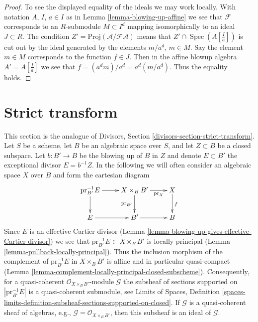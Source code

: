 \documentclass{stacks-project}
\theoremstyle{plain}
\theoremstyle{definition}
\theoremstyle{remark}
\numberwithin{equation}{subsection}
\def\Spec{\mathop{\mathrm{Spec}}}
\begin{document}
\begin{proof}
\medskip\noindent
To see the displayed equality of the ideals we may work locally.
With notation $A$, $I$, $a \in I$ as in Lemma \ref{lemma-blowing-up-affine}
we see that $\mathcal{F}$ corresponds to an $R$-submodule $M \subset I^d$
mapping isomorphically to an ideal $J \subset R$. The condition
$Z' = \underline{\text{Proj}}(\mathcal{A}/\mathcal{F}\mathcal{A})$
means that $Z' \cap \Spec(A[\frac{I}{a}])$ is cut out by the ideal
generated by the elements $m/a^d$, $m \in M$. Say the element $m \in M$
corresponds to the function $f \in J$. Then in the affine blowup algebra
$A' = A[\frac{I}{a}]$ we see that $f = (a^dm)/a^d = a^d (m/a^d)$.
Thus the equality holds.
\end{proof}









\section{Strict transform}
\label{section-strict-transform}

\noindent
This section is the analogue of
Divisors, Section \ref{divisors-section-strict-transform}.
Let $S$ be a scheme, let $B$ be an algebraic space over $S$, and
let $Z \subset B$ be a closed subspace.
Let $b : B' \to B$ be the blowing up of $B$ in $Z$ and denote $E \subset B'$
the exceptional divisor $E = b^{-1}Z$. In the following we will often
consider an algebraic space $X$ over $B$ and form the cartesian diagram
$$
\xymatrix{
\text{pr}_{B'}^{-1}E \ar[r] \ar[d] &
X \times_B B' \ar[r]_-{\text{pr}_X} \ar[d]_{\text{pr}_{B'}} &
X \ar[d]^f \\
E \ar[r] & B' \ar[r] & B
}
$$
Since $E$ is an effective Cartier divisor
(Lemma \ref{lemma-blowing-up-gives-effective-Cartier-divisor})
we see that $\text{pr}_{B'}^{-1}E \subset X \times_B B'$
is locally principal
(Lemma \ref{lemma-pullback-locally-principal}).
Thus the inclusion morphism of the complement of
$\text{pr}_{B'}^{-1}E$ in $X \times_B B'$
is affine and in particular quasi-compact
(Lemma \ref{lemma-complement-locally-principal-closed-subscheme}).
Consequently, for a quasi-coherent $\mathcal{O}_{X \times_B B'}$-module
$\mathcal{G}$ the subsheaf of sections supported on $|\text{pr}_{B'}^{-1}E|$
is a quasi-coherent submodule, see
Limits of Spaces, Definition
\ref{spaces-limits-definition-subsheaf-sections-supported-on-closed}.
If $\mathcal{G}$ is a quasi-coherent sheaf of algebras, e.g.,
$\mathcal{G} = \mathcal{O}_{X \times_B B'}$, then this subsheaf is an ideal
of $\mathcal{G}$.
\end{document}
